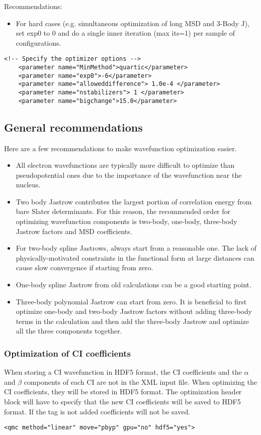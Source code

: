 Recommendations:
\begin{itemize}
  \item{For hard cases (e.g. simultaneous optimization of long MSD and 3-Body J), set exp0
to 0 and do a single inner iteration (max its=1) per sample of configurations.}
\end{itemize}

\begin{lstlisting}[style=QMCPXML]
    <!-- Specify the optimizer options -->
    <parameter name="MinMethod">quartic</parameter>
    <parameter name="exp0">-6</parameter>
    <parameter name="alloweddifference"> 1.0e-4 </parameter>
    <parameter name="nstabilizers"> 1 </parameter>
    <parameter name="bigchange">15.0</parameter>
\end{lstlisting}

\subsection{General recommendations}
Here are a few recommendations to make wavefunction optimization easier.
\begin{itemize}
\item All electron wavefunctions are typically more difficult to optimize than pseudopotential ones due to the importance of the wavefunction near the nucleus.
\item Two body Jastrow contributes the largest portion of correlation energy from bare Slater determinants. For this reason, the recommended order for optimizing wavefunction components is two-body, one-body, three-body Jastrow factors and MSD coefficients.
\item For two-body spline Jastrows, always start from a reasonable one. The lack of physically-motivated constraints in the functional form at large distances can cause slow convergence if starting from zero. 
\item One-body spline Jastrow from old calculations can be a good starting point.
\item Three-body polynomial Jastrow can start from zero. It is beneficial to first optimize one-body and two-body Jastrow factors without adding three-body terms in the calculation and then add the three-body Jastrow and optimize all the three components together.
\end{itemize}
\subsubsection{Optimization of CI coefficients}
When storing a CI wavefunction in HDF5 format, the CI coefficients and the $\alpha$ and $\beta$ components of each CI are not in the XML input file. When optimizing the CI coefficients, they will be stored in HDF5 format. 
The optimization header block will have to specify that the new CI coefficients will be saved to HDF5 format. If the tag is not added coefficients will not be saved. 
\begin{lstlisting}[style=QMCPXML]
  <qmc method="linear" move="pbyp" gpu="no" hdf5="yes">
\end{lstlisting}

